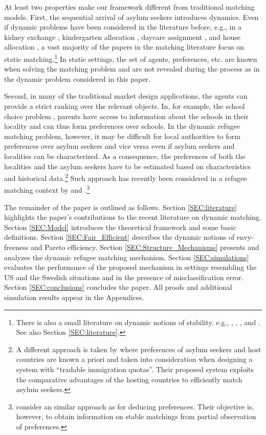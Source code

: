 \documentclass[12pt,fleqn]{article}
\begin{document}
At least two properties make our framework different from traditional matching models. First, the sequential arrival of asylum seekers introduces dynamics. Even if dynamic problems have been considered in the literature before, e.g., in a kidney exchange \citep{bib:Unver}, kindergarten allocation \citep{bib:KennesEtAl2014}, daycare assignment \citep{bib:KennesEtAl2014}, and house allocation \citep{bib:BlochCantala,bib:Kurino}, a vast majority of the papers in the matching literature focus on static matching.\footnote{There is also a small literature on dynamic notions of stability, e.g., \citet{bib:DamianoLam}, \citet{bib:Gudmundsson}, \citet{bib:KadamEtAl2018b}, and \citet{bib:Kurino}. See also Section \ref{SEC:literature}.} In static settings, the set of agents, preferences, etc. are known when solving the matching problem and are not revealed during the process as in the dynamic problem considered in this paper.

Second, in many of the traditional market design applications, the agents can provide a strict ranking over the relevant objects. In, for example, the school choice problem \citep{bib:AbdulkadirougluSonmez}, parents have access to information about the schools in their locality and can thus form preferences over schools. In the dynamic refugee matching problem, however, it may be difficult for local authorities to form preferences over asylum seekers and vice versa even if asylum seekers and localities can be characterized. As a consequence, the preferences of both the localities and the asylum seekers have to be estimated based on characteristics and historical data.\footnote{A different approach is taken by \citet{bib:MoragaEtAl} where preferences of asylum seekers and host countries are known a priori and taken into consideration when designing a system with ``tradable immigration quotas''. Their proposed system exploits the comparative advantages of the hosting countries to efficiently match asylum seekers.} Such approach has recently been considered in a refugee matching context by \citet{bib:AnderssonEhlers} and \citet{bib:BansakEtAl}.\footnote{\citet{bib:HaeringerIehle} consider an similar approach as \citet{bib:AnderssonEhlers} for deducing preferences. Their objective is, however, to obtain information on stable matchings from partial observation of preferences.}

The remainder of the paper is outlined as follows. Section \ref{SEC:literature} highlights the paper's contributions to the recent literature on dynamic matching. Section \ref{SEC:Model} introduces the theoretical framework and some basic definitions. Section \ref{SEC:Fair_Efficient} describes the dynamic notions of envy-freeness and Pareto efficiency. Section \ref{SEC:Structure_Mechanisms} presents and analyzes the dynamic refugee matching mechanism. Section \ref{SEC:simulations} evaluates the performance of the proposed mechanism in settings resembling the US and the Swedish situations and in the presence of misclassification error. Section \ref{SEC:conclusions} concludes the paper. All proofs and additional simulation results appear in the Appendices.
\end{document}
